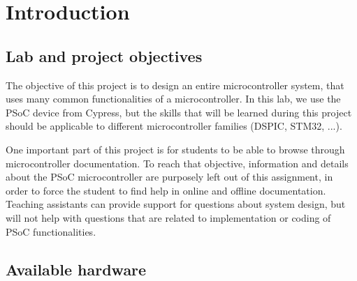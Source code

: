 \section{Introduction}

\subsection{Lab and project objectives}

The objective of this project is to design an entire microcontroller system, that uses many common functionalities of a microcontroller. In this lab, we use the PSoC device from Cypress, but the skills that will be learned during this project should be applicable to different microcontroller families (DSPIC, STM32, ...). 

One important part of this project is for students to be able to browse through microcontroller documentation. To reach that objective, information and details about the PSoC microcontroller are purposely left out of this assignment, in order to force the student to find help in online and offline documentation. Teaching assistants can provide support for questions about system design, but will not help with questions that are related to implementation or coding of PSoC functionalities. 


\subsection{Available hardware}

